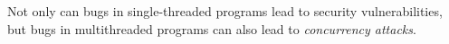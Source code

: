 Not only can bugs in single-threaded programs lead to security vulnerabilities, 
but bugs in multithreaded programs can also lead to \emph{concurrency attacks}. 
